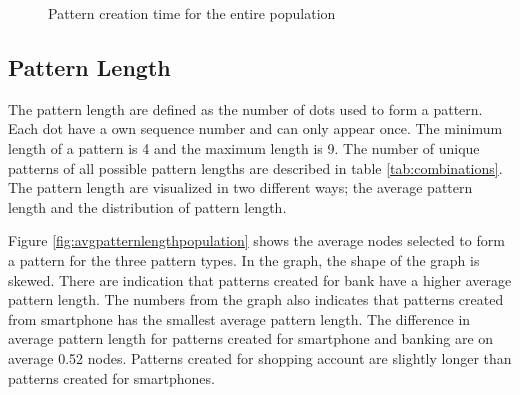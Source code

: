 		\begin{figure}[H]
      \caption{Pattern creation time for the entire population}
      \label{fig:patterncreationtimepopulation}
    \end{figure}

	\subsection{Pattern Length}

    The pattern length are defined as the number of dots used to form a pattern. Each dot have a own sequence number and can only appear once. The minimum length of a pattern is 4 and the maximum length is 9. The number of unique patterns of all possible pattern lengths are described in table \ref{tab:combinations}. The pattern length are visualized in two different ways; the average pattern length and the distribution of pattern length.

    Figure \ref{fig:avgpatternlengthpopulation} shows the average nodes selected to form a pattern for the three pattern types. In the graph, the shape of the graph is skewed. There are indication that patterns created for bank have a higher average pattern length. The numbers from the graph also indicates that patterns created from smartphone has the smallest average pattern length. The difference in average pattern length for patterns created for smartphone and banking are on average 0.52 nodes. Patterns created for shopping account are slightly longer than patterns created for smartphones.

